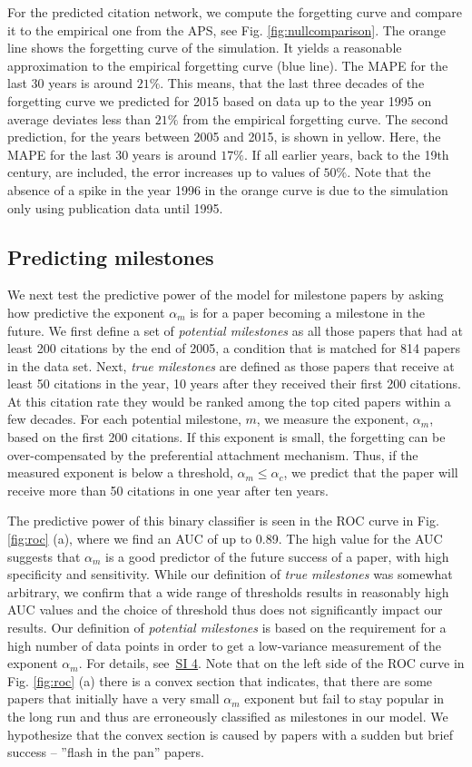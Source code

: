 \documentclass[fleqn,10pt]{wlscirep}
\begin{document}
For the predicted citation network, we compute the forgetting curve and compare it to the empirical one from the APS, see Fig. \ref{fig:nullcomparison}. The orange line shows the forgetting curve of the simulation. It yields a reasonable  approximation to the empirical forgetting curve (blue line). The MAPE for the last 30 years is around $21\%$. This means, that the last three decades of the forgetting curve we predicted for 2015 based on data up to the year 1995 on average deviates  less than $21\%$ from the empirical forgetting curve. The second prediction, for the years between 2005 and 2015, is shown in yellow. Here, the MAPE for the last 30 years is around $17\%$. If all earlier years, back to the 19th century, are included, the error increases up to values of $50\%$. Note that the absence of a spike in the year 1996 in the orange curve is due to the simulation only using publication data until 1995. 


\subsection*{Predicting milestones} We next test the predictive power of the model for milestone papers by asking how predictive the exponent $\alpha_m$ is for a paper becoming a milestone in the future. We first define a set of \emph{potential milestones} as all those papers that had at least 200 citations by the end of  2005, a condition that is matched for 814 papers in the data set. Next, {\em true milestones} are defined as those papers that receive at least 50 citations in the year, 10 years after they received their first 200 citations. At this citation rate  they would be ranked among the top cited papers within a few decades. For each potential milestone, $m$, we measure the exponent, $\alpha_m$, based on the first 200 citations.
If this exponent is small, the forgetting can be over-compensated by the preferential attachment mechanism. Thus, if the measured exponent is below a threshold, $\alpha_m \leq \alpha_c$, we predict that the paper will receive more than 50 citations in one year after ten years.

The predictive power of this binary classifier is seen in the ROC curve in Fig. \ref{fig:roc} (a), where we find an AUC of up to 0.89. The high value for the AUC suggests that $\alpha_m$ is a good predictor of the future success of a paper, with high specificity and sensitivity. While our definition of {\em true milestones} was somewhat arbitrary, we confirm that a wide range of thresholds results in reasonably high AUC values and the choice of threshold thus does not significantly impact our results. Our definition of \emph{potential milestones} is based on the requirement for a high number of data points in order to get a low-variance measurement of the exponent $\alpha_m$. For details, see~\hyperref[SI4]{SI 4}.
Note that on the left side of the ROC curve in Fig. \ref{fig:roc} (a) there is a convex section that indicates, that there are some papers that initially have a very small  $\alpha_m$ exponent but fail to stay popular in the long run and thus are erroneously classified as milestones in our model. We hypothesize that the convex section is caused by papers with a sudden but brief success -- ''flash in the pan'' papers.   
\end{document}

